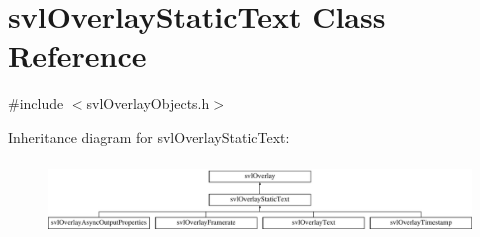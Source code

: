 \hypertarget{classsvl_overlay_static_text}{\section{svl\-Overlay\-Static\-Text Class Reference}
\label{classsvl_overlay_static_text}
}


{\ttfamily \#include $<$svl\-Overlay\-Objects.\-h$>$}

Inheritance diagram for svl\-Overlay\-Static\-Text\-:\begin{figure}[H]
\begin{center}
\leavevmode
\includegraphics[height=1.971831cm]{df/d44/classsvl_overlay_static_text}
\end{center}
\end{figure}

